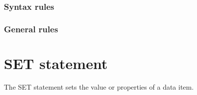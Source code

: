 \subsubsection{Syntax rules}

\subsubsection{General rules}

\section{SET statement}

The SET statement sets the value or properties of a data item.

\begin{syntax}
   \identifier {}
  \begin{1=}
    \identifier \\
    \literal \\
    \arithmeticexpression
  \end{1=}
\end{syntax}

\begin{syntax}[\gnucobolcolour]
   \identifier {} 
  \begin{1=}
    \identifier \\
    \literal
  \end{1=}
\end{syntax}

\begin{syntax}[\miscextcolour]
   
  \begin{1=}
    \identifier \\
    \literal
  \end{1=}
  \begin{1=}
    \identifier \\
    \literal
  \end{1=}
\end{syntax}

